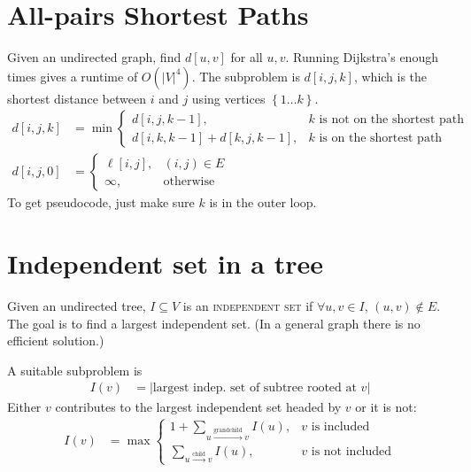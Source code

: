 \section{All-pairs Shortest Paths}
Given an undirected graph, find \(d[u, v]\) for all \(u,v\). Running Dijkstra's enough times gives a runtime of \(O\left(\left|V\right|^4\right)\).
The subproblem is \(d[i, j, k]\), which is the shortest distance between \(i\) and \(j\) using vertices \(\left\{1\ldots k\right\}\).
\begin{align}
d[i,j,k] &= \min \begin{cases}
d[i,j,k - 1], &\text{\(k\) is not on the shortest path} \\
d[i, k, k - 1] + d[k,j, k - 1], &\text{\(k\) is on the shortest path}
\end{cases} \\
d[i,j, 0] &= \begin{cases}
\ell[i,j], &(i,j) \in E \\
\infty, &\text{otherwise}
\end{cases}
\end{align}
To get pseudocode, just make sure \(k\) is in the outer loop.

\section{Independent set in a tree}
Given an undirected tree, \(I\subseteq V\) is an \textsc{independent set} if \(\forall u,v\in I\), \(\left(u,v\right)\notin E\). The goal is to find a largest independent set. (In a general graph there is no efficient solution.)

A suitable subproblem is
\begin{align}
I(v) &= \left|\text{largest indep.~set of subtree rooted at \(v\)}\right|
\end{align}
Either \(v\) contributes to the largest independent set headed by \(v\) or it is not:
\begin{align}
I(v) &= \max \begin{cases}
	1 + \sum_{u\xrightarrow{\text{grandchild}}v} I(u), &\text{\(v\) is included}\\
	\sum_{u\xrightarrow{\text{child}}v} I(u), &\text{\(v\) is not included}
\end{cases}
\end{align}